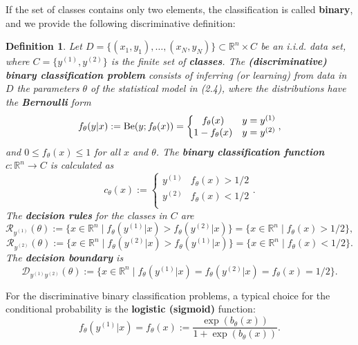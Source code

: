 \documentclass{report}
\newtheorem{definition}{Definition}[chapter]
\begin{document}
If the set of classes contains only two elements, the classification is called \textbf{binary}, and we provide the following discriminative definition:

\begin{definition}
Let $D = \{(x_1,y_1),\dots,(x_N,y_N)\} \subset \mathbb{R}^n \times C$ be an i.i.d. data set, where $C = \{y^{(1)}, y^{(2)}\}$ is the finite set of \textbf{classes}. The \textbf{(discriminative) binary classification problem} consists of inferring (or learning) from data in $D$ the parameters $\theta$ of the statistical model in (2.4), where the distributions have the \textbf{Bernoulli} form
\begin{equation}
f_\theta(y|x) := \textup{Be}(y;f_\theta(x)) = \left\{\begin{matrix}
f_\theta(x) & y=y^{(1)}\\
1 - f_\theta(x) & y = y^{(2)} \\
\end{matrix}\right.,
\end{equation}
and $0 \leq f_\theta(x) \leq 1$ for all $x$ and $\theta$. The \textbf{binary classification function} $c : \mathbb{R}^n \to C$ is calculated as
\begin{equation}
c_\theta(x) := \left\{\begin{matrix}
y^{(1)} & f_\theta(x) > 1/2\\
y^{(2)} & f_\theta(x) < 1/2\\
\end{matrix}\right..
\end{equation}
The \textbf{decision rules} for the classes in $C$ are
\begin{equation}
\mathcal{R}_{y^{(1)}}(\theta) := \{x \in \mathbb{R}^n \mid f_\theta(y^{(1)}|x) > f_\theta(y^{(2)}|x)\} = \{x \in \mathbb{R}^n \mid f_\theta(x) > 1/2\},
\end{equation}
\begin{equation}
\mathcal{R}_{y^{(2)}}(\theta) := \{x \in \mathbb{R}^n \mid f_\theta(y^{(2)}|x) > f_\theta(y^{(1)}|x)\} = \{x \in \mathbb{R}^n \mid f_\theta(x) < 1/2\}.
\end{equation}
The \textbf{decision boundary} is
\begin{equation}
\mathcal{D}_{y^{(1)}y^{(2)}}(\theta) := \{x \in \mathbb{R}^n \mid f_\theta(y^{(1)}|x) = f_\theta(y^{(2)}|x) = f_\theta(x) = 1/2\}.
\end{equation}
\end{definition}

For the discriminative binary classification problems, a typical choice for the conditional probability is the \textbf{logistic (sigmoid)} function:
\begin{equation}
f_\theta(y^{(1)}|x) = f_\theta(x) := \frac{\exp (b_\theta(x))}{1+\exp (b_\theta(x))}.
\end{equation}
\end{document}
